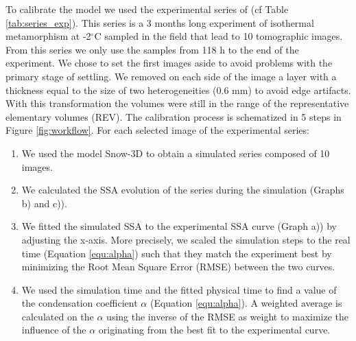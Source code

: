 \documentclass[draft,ms]{agujournal2019}
\begin{document}
To calibrate the model we used the experimental series of  (cf Table \ref{tab:series_exp}). This series is a 3 months long experiment of isothermal metamorphism at -2$^\circ$C sampled in the field that lead to 10 tomographic images. From this series we only use the samples from 118 h to the end of the experiment. We chose to set the first images aside to avoid problems with the primary stage of settling. We removed on each side of the image a layer with a thickness equal to the size of two heterogeneities (0.6 mm) to avoid edge artifacts. With this transformation the volumes were still in the range of the representative elementary volumes (REV). The calibration process is schematized in 5 steps in Figure \ref{fig:workflow}. For each selected image of the experimental series: \\
\begin{enumerate}
    \item We used the model Snow-3D to obtain a simulated series composed of 10 images. 
    \item We calculated the SSA evolution of the series during the simulation (Graphs b) and c)).
    \item We fitted the simulated SSA to the experimental SSA curve (Graph a)) by adjusting the x-axis. More precisely, we scaled the simulation steps to the real time (Equation \ref{equ:alpha}) such that they match the experiment best by minimizing the Root Mean Square Error (RMSE) between the two curves.   
    \item We used the simulation time and the fitted physical time to find a value of the condensation coefficient $\alpha$ (Equation \ref{equ:alpha}). A weighted average is calculated on the $\alpha$ using the inverse of the RMSE as weight to maximize the influence of the $\alpha$ originating from the best fit to the experimental curve. 
\end{enumerate}
\end{document}
